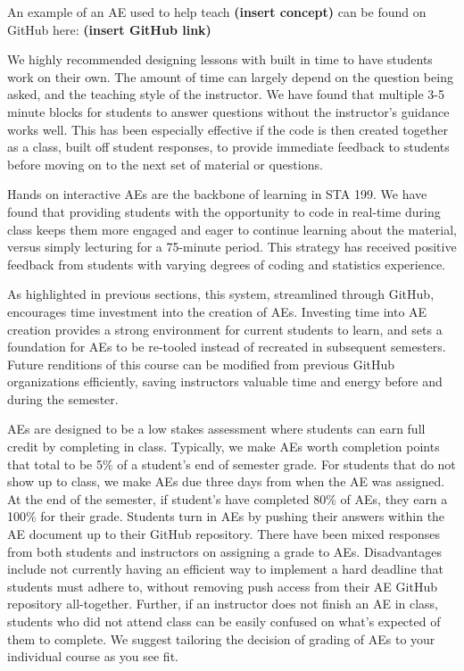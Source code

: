 \documentclass[
  12pt]{article}
\begin{document}
An example of an AE used to help teach \textbf{(insert concept)} can be
found on GitHub here: \textbf{(insert GitHub link)}

We highly recommended designing lessons with built in time to have
students work on their own. The amount of time can largely depend on the
question being asked, and the teaching style of the instructor. We have
found that multiple 3-5 minute blocks for students to answer questions
without the instructor's guidance works well. This has been especially
effective if the code is then created together as a class, built off
student responses, to provide immediate feedback to students before
moving on to the next set of material or questions.

Hands on interactive AEs are the backbone of learning in STA 199. We
have found that providing students with the opportunity to code in
real-time during class keeps them more engaged and eager to continue
learning about the material, versus simply lecturing for a 75-minute
period. This strategy has received positive feedback from students with
varying degrees of coding and statistics experience.

As highlighted in previous sections, this system, streamlined through
GitHub, encourages time investment into the creation of AEs. Investing
time into AE creation provides a strong environment for current students
to learn, and sets a foundation for AEs to be re-tooled instead of
recreated in subsequent semesters. Future renditions of this course can
be modified from previous GitHub organizations efficiently, saving
instructors valuable time and energy before and during the semester.

AEs are designed to be a low stakes assessment where students can earn
full credit by completing in class. Typically, we make AEs worth
completion points that total to be 5\% of a student's end of semester
grade. For students that do not show up to class, we make AEs due three
days from when the AE was assigned. At the end of the semester, if
student's have completed 80\% of AEs, they earn a 100\% for their grade.
Students turn in AEs by pushing their answers within the AE document up
to their GitHub repository. There have been mixed responses from both
students and instructors on assigning a grade to AEs. Disadvantages
include not currently having an efficient way to implement a hard
deadline that students must adhere to, without removing push access from
their AE GitHub repository all-together. Further, if an instructor does
not finish an AE in class, students who did not attend class can be
easily confused on what's expected of them to complete. We suggest
tailoring the decision of grading of AEs to your individual course as
you see fit.
\end{document}
